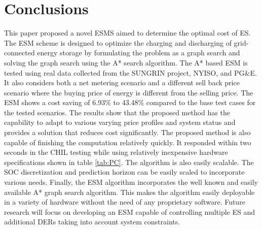 \documentclass[journal]{IEEEtran}
\begin{document}
\section{Conclusions}
This paper proposed a novel ESMS aimed to determine the optimal cost of ES. The ESM scheme is designed to optimize the charging and discharging of grid-connected energy storage by formulating the problem as a graph search and solving the graph search using the A* search algorithm. The A* based ESM is tested using real data collected from the SUNGRIN project, NYISO, and PG\&E. It also considers both a net metering scenario and a different sell back price scenario where the buying price of energy is different from the selling price. The ESM shows a cost saving of 6.93\% to 43.48\% compared to the base test cases for the tested scenarios. The results show that the proposed method has the capability to adapt to various varying price profiles and system status and provides a solution that reduces cost significantly. The proposed method is also capable of finishing the computation relatively quickly. It responded within two seconds in the CHIL testing while using relatively inexpensive hardware specifications shown in table \ref{tab:PC}. The algorithm is also easily scalable. The SOC discretization and prediction horizon can be easily scaled to incorporate various needs. Finally, the ESM algorithm incorporates the well known and easily available A* graph search algorithm. This makes the algorithm easily deployable in a variety of hardware without the need of any proprietary software. Future research will focus on developing an ESM capable of controlling multiple ES and additional DERs taking into account system constraints.




\ifCLASSOPTIONcaptionsoff
  \newpage
\fi
\end{document}
